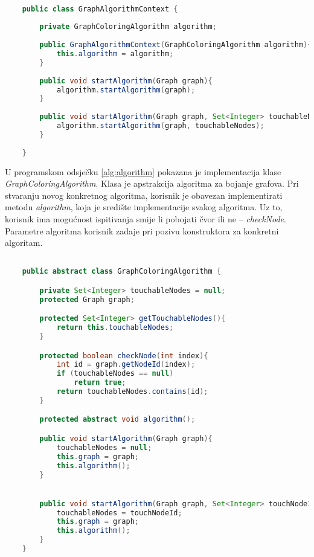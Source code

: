 \documentclass[times, utf8, diplomski, numeric]{fer}
\begin{document}
\begin{singlespace}
	\begin{lstlisting}[label=alg:strategija, language=Java, caption=Definicija klase i metoda za oblikovni obrazac strategija]

	public class GraphAlgorithmContext {
	
		private GraphColoringAlgorithm algorithm;
	
		public GraphAlgorithmContext(GraphColoringAlgorithm algorithm){
			this.algorithm = algorithm;
		}
	
		public void startAlgorithm(Graph graph){
			algorithm.startAlgorithm(graph);
		}
	
		public void startAlgorithm(Graph graph, Set<Integer> touchableNodes){
			algorithm.startAlgorithm(graph, touchableNodes);
		}
	
	}

	\end{lstlisting}
\end{singlespace}

U programskom odsječku \ref{alg:algorithm} pokazana je implementacija klase \emph{GraphColoringAlgorithm}. Klasa je apstrakcija algoritma za bojanje grafova. Pri stvaranju novog konkretnog algoritma, korisnik je obavezan implementirati metodu \emph{algorithm}, koja je središte implementacije svakog algoritma. Uz to, korisnik ima mogućnost ispitivanja smije li pobojati čvor ili ne -- \emph{checkNode}. Parametre algoritma korisnik zadaje pri pozivu konstruktora za konkretni algoritam.

\begin{singlespace}
	\begin{lstlisting}[label=alg:algorithm, language=Java, caption=Apstraktna klasa algoritma]

	public abstract class GraphColoringAlgorithm {

		private Set<Integer> touchableNodes = null;
		protected Graph graph;

		protected Set<Integer> getTouchableNodes(){
			return this.touchableNodes;
		}

		protected boolean checkNode(int index){
			int id = graph.getNodeId(index);
			if (touchableNodes == null)
				return true;
			return touchableNodes.contains(id);
		}

		protected abstract void algorithm();

		public void startAlgorithm(Graph graph){
			touchableNodes = null;
			this.graph = graph;
			this.algorithm();
		}


		public void startAlgorithm(Graph graph, Set<Integer> touchNodeId){
			touchableNodes = touchNodeId;
			this.graph = graph;
			this.algorithm();
		}
	}
	\end{lstlisting}
\end{singlespace}
\end{document}
